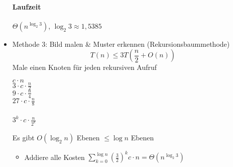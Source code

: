 \begin{itemize}
        \paragraph*{Laufzeit} $\Theta(n^{\log_2 3})$, $\log_2 3 \approx 1{,}5385$
\item   Methode 3: Bild malen \& Muster erkennen (Rekursionsbaummethode)
        \[T(n) \leq 3 T\left(\frac{n}{2} + O(n)\right)\]
        Male einen Knoten für jeden rekursiven Aufruf
        \begin{center}
        \begin{minipage}{0.3\textwidth}
        \end{minipage}
        \vline
        \begin{minipage}{0.3\textwidth}
            \centering
            $c \cdot n$ \\[0.3cm]
            $3 \cdot c \cdot \frac{n}{2}$ \\[0.3cm]
            $9 \cdot c \cdot \frac{n}{4}$ \\[0.3cm]
            $27 \cdot c \cdot \frac{n}{8}$ \\[0.3cm]
            \hspace{0cm} \\[0.3cm]
            $3^k \cdot c \cdot \frac{n}{2^k}$
        \end{minipage}
        \end{center}
        Es gibt $O(\log_2 n)$ Ebenen $\leq \log n$ Ebenen
        \begin{itemize}
        \item Addiere alle Kosten $\sum\limits_{k = 0}^{\log n} \left(\frac{3}{2}\right)^k c \cdot n = \Theta(n^{\log_2 3})$

\end{itemize}
\end{itemize}
